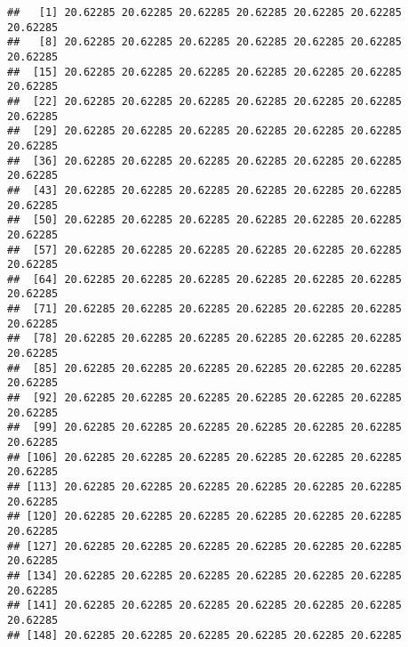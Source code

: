 \documentclass[]{article}
\newenvironment{Shaded}{\begin{snugshade}}{\end{snugshade}}
\newcommand{\KeywordTok}[1]{\textcolor[rgb]{0.13,0.29,0.53}{\textbf{#1}}}
\newcommand{\FloatTok}[1]{\textcolor[rgb]{0.00,0.00,0.81}{#1}}
\newcommand{\StringTok}[1]{\textcolor[rgb]{0.31,0.60,0.02}{#1}}
\newcommand{\OperatorTok}[1]{\textcolor[rgb]{0.81,0.36,0.00}{\textbf{#1}}}
\newcommand{\NormalTok}[1]{#1}
\begin{document}
\begin{Shaded}
\end{Shaded}

\begin{verbatim}
##   [1] 20.62285 20.62285 20.62285 20.62285 20.62285 20.62285 20.62285
##   [8] 20.62285 20.62285 20.62285 20.62285 20.62285 20.62285 20.62285
##  [15] 20.62285 20.62285 20.62285 20.62285 20.62285 20.62285 20.62285
##  [22] 20.62285 20.62285 20.62285 20.62285 20.62285 20.62285 20.62285
##  [29] 20.62285 20.62285 20.62285 20.62285 20.62285 20.62285 20.62285
##  [36] 20.62285 20.62285 20.62285 20.62285 20.62285 20.62285 20.62285
##  [43] 20.62285 20.62285 20.62285 20.62285 20.62285 20.62285 20.62285
##  [50] 20.62285 20.62285 20.62285 20.62285 20.62285 20.62285 20.62285
##  [57] 20.62285 20.62285 20.62285 20.62285 20.62285 20.62285 20.62285
##  [64] 20.62285 20.62285 20.62285 20.62285 20.62285 20.62285 20.62285
##  [71] 20.62285 20.62285 20.62285 20.62285 20.62285 20.62285 20.62285
##  [78] 20.62285 20.62285 20.62285 20.62285 20.62285 20.62285 20.62285
##  [85] 20.62285 20.62285 20.62285 20.62285 20.62285 20.62285 20.62285
##  [92] 20.62285 20.62285 20.62285 20.62285 20.62285 20.62285 20.62285
##  [99] 20.62285 20.62285 20.62285 20.62285 20.62285 20.62285 20.62285
## [106] 20.62285 20.62285 20.62285 20.62285 20.62285 20.62285 20.62285
## [113] 20.62285 20.62285 20.62285 20.62285 20.62285 20.62285 20.62285
## [120] 20.62285 20.62285 20.62285 20.62285 20.62285 20.62285 20.62285
## [127] 20.62285 20.62285 20.62285 20.62285 20.62285 20.62285 20.62285
## [134] 20.62285 20.62285 20.62285 20.62285 20.62285 20.62285 20.62285
## [141] 20.62285 20.62285 20.62285 20.62285 20.62285 20.62285 20.62285
## [148] 20.62285 20.62285 20.62285 20.62285 20.62285 20.62285
\end{verbatim}
\end{document}
